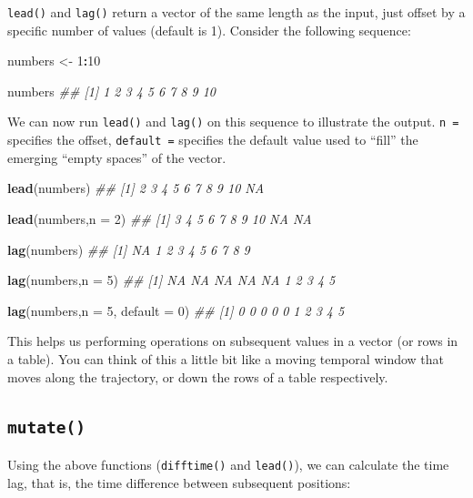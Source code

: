 \documentclass[]{book}
\newenvironment{Shaded}{\begin{snugshade}}{\end{snugshade}}
\newcommand{\CommentTok}[1]{\textcolor[rgb]{0.56,0.35,0.01}{\textit{#1}}}
\newcommand{\DataTypeTok}[1]{\textcolor[rgb]{0.13,0.29,0.53}{#1}}
\newcommand{\DecValTok}[1]{\textcolor[rgb]{0.00,0.00,0.81}{#1}}
\newcommand{\KeywordTok}[1]{\textcolor[rgb]{0.13,0.29,0.53}{\textbf{#1}}}
\newcommand{\NormalTok}[1]{#1}
\newcommand{\OperatorTok}[1]{\textcolor[rgb]{0.81,0.36,0.00}{\textbf{#1}}}
\newcommand{\StringTok}[1]{\textcolor[rgb]{0.31,0.60,0.02}{#1}}
\begin{document}
\texttt{lead()} and \texttt{lag()} return a vector of the same length as the input, just offset by a specific number of values (default is 1). Consider the following sequence:

\begin{Shaded}
\begin{Highlighting}[]
\NormalTok{numbers <-}\StringTok{ }\DecValTok{1}\OperatorTok{:}\DecValTok{10}

\NormalTok{numbers}
\CommentTok{##  [1]  1  2  3  4  5  6  7  8  9 10}
\end{Highlighting}
\end{Shaded}

We can now run \texttt{lead()} and \texttt{lag()} on this sequence to illustrate the output. \texttt{n\ =} specifies the offset, \texttt{default\ =} specifies the default value used to ``fill'' the emerging ``empty spaces'' of the vector.

\begin{Shaded}
\begin{Highlighting}[]
\KeywordTok{lead}\NormalTok{(numbers)}
\CommentTok{##  [1]  2  3  4  5  6  7  8  9 10 NA}

\KeywordTok{lead}\NormalTok{(numbers,}\DataTypeTok{n =} \DecValTok{2}\NormalTok{)}
\CommentTok{##  [1]  3  4  5  6  7  8  9 10 NA NA}

\KeywordTok{lag}\NormalTok{(numbers)}
\CommentTok{##  [1] NA  1  2  3  4  5  6  7  8  9}

\KeywordTok{lag}\NormalTok{(numbers,}\DataTypeTok{n =} \DecValTok{5}\NormalTok{)}
\CommentTok{##  [1] NA NA NA NA NA  1  2  3  4  5}

\KeywordTok{lag}\NormalTok{(numbers,}\DataTypeTok{n =} \DecValTok{5}\NormalTok{, }\DataTypeTok{default =} \DecValTok{0}\NormalTok{)}
\CommentTok{##  [1] 0 0 0 0 0 1 2 3 4 5}
\end{Highlighting}
\end{Shaded}

This helps us performing operations on subsequent values in a vector (or rows in a table). You can think of this a little bit like a moving temporal window that moves along the trajectory, or down the rows of a table respectively.

\hypertarget{mutate}{%
\subsection{\texorpdfstring{\texttt{mutate()}}{mutate()}}\label{mutate}}

Using the above functions (\texttt{difftime()} and \texttt{lead()}), we can calculate the time lag, that is, the time difference between subsequent positions:
\end{document}

